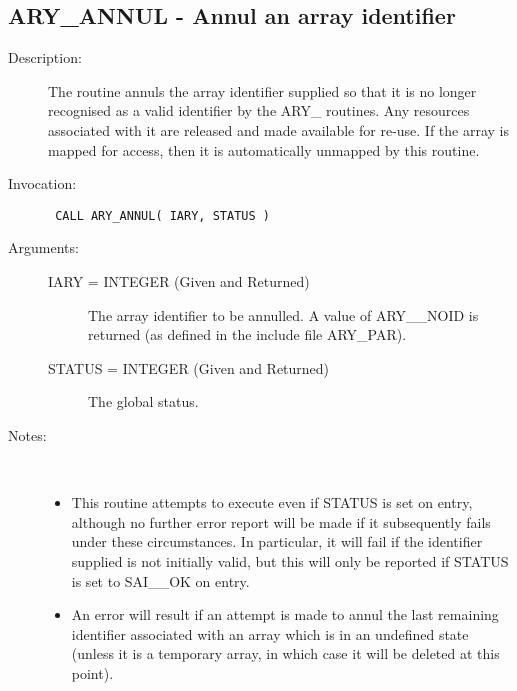 \documentclass[twoside,11pt]{article}
\newcommand{\xlabel}[1]{}
\newlength{\sstbannerlength}
\newlength{\sstcaptionlength}
\newlength{\sstexampleslength}
\newlength{\sstexampleswidth}
\newcommand{\sstroutine}[3]{
   \goodbreak
   \rule{\textwidth}{0.5mm}
   \vspace{-7ex}
   \newline
   \settowidth{\sstbannerlength}{{\Large {\bf #1}}}
   \setlength{\sstcaptionlength}{\textwidth}
   \setlength{\sstexampleslength}{\textwidth}
   \addtolength{\sstbannerlength}{0.5em}
   \addtolength{\sstcaptionlength}{-2.0\sstbannerlength}
   \addtolength{\sstcaptionlength}{-5.0pt}
   \settowidth{\sstexampleswidth}{{\bf Examples:}}
   \addtolength{\sstexampleslength}{-\sstexampleswidth}
   \parbox[t]{\sstbannerlength}{\flushleft{\Large {\bf #1}}}
   \parbox[t]{\sstcaptionlength}{\center{\Large #2}}
   \parbox[t]{\sstbannerlength}{\flushright{\Large {\bf #1}}}
   \begin{description}
      #3
   \end{description}
}
\newcommand{\sstdescription}[1]{\item[Description:] #1}
\newcommand{\sstinvocation}[1]{\item[Invocation:]\hspace{0.4em}{\tt #1}}
\newcommand{\sstarguments}[1]{
   \item[Arguments:] \mbox{} \\
   \vspace{-3.5ex}
   \begin{description}
      #1
   \end{description}
}
\newcommand{\sstsubsection}[1]{ \item[{#1}] \mbox{} \\}
\newcommand{\sstnotes}[1]{\item[Notes:] \mbox{} \\[1.3ex] #1}
\newcommand{\sstitemlist}[1]{
  \mbox{} \\
  \vspace{-3.5ex}
  \begin{itemize}
     #1
  \end{itemize}
}
\newcommand{\sstitem}{\item}
\newcommand{\ssttt}{\tt}
\renewcommand{\sstroutine}[3]{
      \subsection{#1\xlabel{#1}-\label{#1}#2}
      \begin{description}
         #3
      \end{description}
   }
\renewcommand{\sstdescription}[1]{\item[Description:]
      \begin{description}
         #1
      \end{description}
   }
\renewcommand{\sstinvocation}[1]{\item[Invocation:]
      \begin{description}
         {\ssttt #1}
      \end{description}
   }
\renewcommand{\sstarguments}[1]{
      \item[Arguments:]
      \begin{description}
         #1
      \end{description}
   }
\renewcommand{\sstsubsection}[1]{\item[{#1}]}
\renewcommand{\sstnotes}[1]{\item[Notes:]
      \begin{description}
         #1
      \end{description}
   }
\newcommand{\sstitemlist}[1]{
      \begin{itemize}
         #1
      \end{itemize}
   }
\begin{document}
\sstroutine{
   ARY\_ANNUL
}{
   Annul an array identifier
}{
   \sstdescription{
      The routine annuls the array identifier supplied so that it is no
      longer recognised as a valid identifier by the ARY\_ routines.
      Any resources associated with it are released and made available
      for re-use. If the array is mapped for access, then it is
      automatically unmapped by this routine.
   }
   \sstinvocation{
      CALL ARY\_ANNUL( IARY, STATUS )
   }
   \sstarguments{
      \sstsubsection{
         IARY = INTEGER (Given and Returned)
      }{
         The array identifier to be annulled. A value of ARY\_\_NOID is
         returned (as defined in the include file ARY\_PAR).
      }
      \sstsubsection{
         STATUS = INTEGER (Given and Returned)
      }{
         The global status.
      }
   }
   \sstnotes{
      \sstitemlist{

         \sstitem
         This routine attempts to execute even if STATUS is set on
         entry, although no further error report will be made if it
         subsequently fails under these circumstances. In particular, it
         will fail if the identifier supplied is not initially valid, but
         this will only be reported if STATUS is set to SAI\_\_OK on entry.

         \sstitem
         An error will result if an attempt is made to annul the last
         remaining identifier associated with an array which is in an
         undefined state (unless it is a temporary array, in which case it
         will be deleted at this point).
      }
   }
}
\end{document}
